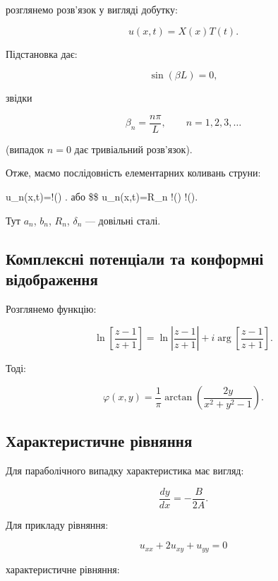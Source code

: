 \documentclass[
  ukrainian,
]{article}
\begin{document}
розглянемо розв'язок у вигляді добутку:

\[
u(x,t)=X(x)T(t).
\]

Підстановка дає:

\[
\sin(\beta L)=0,
\]

звідки

\[
\beta_n = \frac{n\pi}{L}, \qquad n=1,2,3,\ldots
\]

(випадок \(n=0\) дає тривіальний розв'язок).

Отже, маємо послідовність елементарних коливань струни:

u\_n(x,t)=\sin!\left(\right)
. або \$\$
u\_n(x,t)=R\_n \sin!\left(\right)
\cos!\left(\right).

Тут \(a_n\), \(b_n\), \(R_n\), \(\delta_n\) --- довільні сталі.

\subsection{Комплексні потенціали та конформні
відображення}\label{ux43aux43eux43cux43fux43bux435ux43aux441ux43dux456-ux43fux43eux442ux435ux43dux446ux456ux430ux43bux438-ux442ux430-ux43aux43eux43dux444ux43eux440ux43cux43dux456-ux432ux456ux434ux43eux431ux440ux430ux436ux435ux43dux43dux44f}

Розглянемо функцію:

\[
\ln\left[\frac{z-1}{z+1}\right]
= \ln\left|\frac{z-1}{z+1}\right|
+ i \arg\left[\frac{z-1}{z+1}\right].
\]

Тоді:

\[
\varphi(x,y)=\frac{1}{\pi}\arctan\left(\frac{2y}{x^2+y^2-1}\right).
\]

\subsection{Характеристичне
рівняння}\label{ux445ux430ux440ux430ux43aux442ux435ux440ux438ux441ux442ux438ux447ux43dux435-ux440ux456ux432ux43dux44fux43dux43dux44f}

Для параболічного випадку характеристика має вигляд:

\[
\frac{dy}{dx} = -\frac{B}{2A}.
\]

Для прикладу рівняння:

\[
u_{xx} + 2u_{xy} + u_{yy} = 0
\]

характеристичне рівняння:
\end{document}
